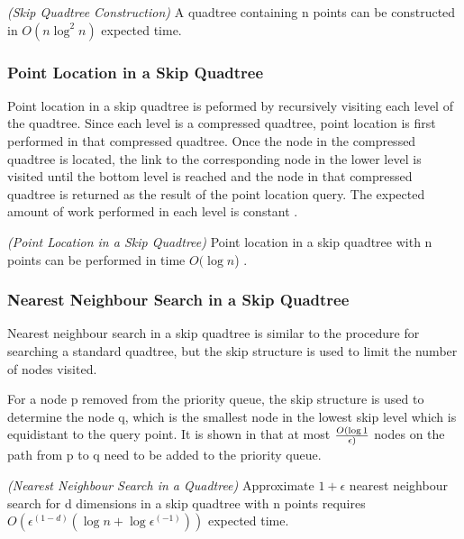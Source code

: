 \documentclass[mcs]{scsthesis}
\begin{document}
\begin{thm} \emph{(Skip Quadtree Construction)}
A quadtree containing n points can be constructed in \(O(n \log^2 n)\)
expected time.
\end{thm}

\subsubsection{Point Location in a Skip Quadtree}

Point location in a skip quadtree is peformed by recursively visiting each level
of the quadtree. Since each level is a compressed quadtree, point location is
first performed in that compressed quadtree. Once the node in the compressed
quadtree is located, the link to the corresponding node in the lower level
is visited until the bottom level is reached and the node in that compressed
quadtree is returned as the result of the point location query. The expected
amount of work performed in each level is constant \cite{skipquadtree}.

\begin{thm} \emph{(Point Location in a Skip Quadtree)} 
Point location in a skip quadtree with n points can be performed in time
\(O(\log n\)) \cite{skipquadtree}. 
\end{thm}

\subsubsection{Nearest Neighbour Search in a Skip Quadtree}

Nearest neighbour search in a skip quadtree is similar to the procedure for
searching a standard quadtree, but the skip structure is used to limit
the number of nodes visited.

For a node p removed from the priority queue, the skip structure is used to
determine the node q, which is the smallest node in the lowest skip level
which is equidistant to the query point. It is shown in \cite{skipquadtree}
that at most \(O(\log 1 \over \epsilon)\) nodes on the path from p to q need
to be added to the priority queue.

\begin{thm} \emph{(Nearest Neighbour Search in a Quadtree)} 
Approximate \(1 + \epsilon\) nearest neighbour search for d dimensions in a skip
quadtree with n points requires
\(O(\epsilon^(1 - d)(\log n + \log \epsilon^(-1)))\) expected time.
\end{thm}
\end{document}
